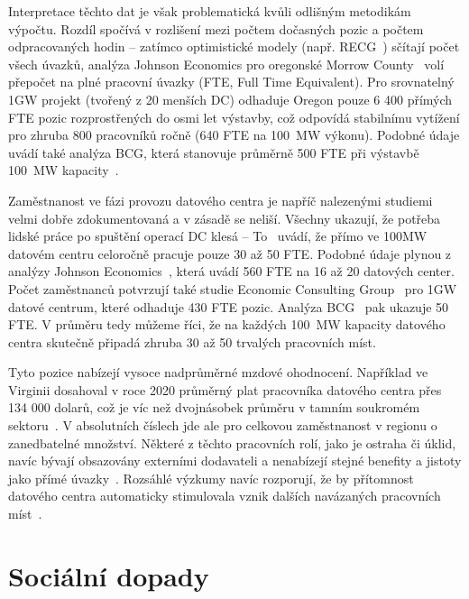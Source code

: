 Interpretace těchto dat je však problematická kvůli odlišným metodikám výpočtu. Rozdíl spočívá v rozlišení mezi počtem dočasných pozic a počtem odpracovaných hodin -- zatímco optimistické modely (např. RECG~\cite{diao_economic_2025}) sčítají počet všech úvazků, analýza Johnson Economics pro oregonské Morrow County~\cite{johnson_economics_economic_2025} volí přepočet na plné pracovní úvazky (FTE, Full Time Equivalent). Pro srovnatelný 1GW projekt (tvořený z 20 menších DC) odhaduje Oregon pouze 6 400 přímých FTE pozic rozprostřených do osmi let výstavby, což odpovídá stabilnímu vytížení pro zhruba 800 pracovníků ročně (640 FTE na 100~MW výkonu). Podobné údaje uvádí také analýza BCG, která stanovuje průměrně 500 FTE při výstavbě 100~MW kapacity~\cite[s.~10]{lee_breaking_2025}.

Zaměstnanost ve fázi provozu datového centra je napříč nalezenými studiemi velmi dobře zdokumentovaná a v zásadě se neliší. Všechny ukazují, že potřeba lidské práce po spuštění operací DC klesá -- To~\cite[s.~7]{to_albertas_2025} uvádí, že přímo ve 100MW datovém centru celoročně pracuje pouze 30 až 50 FTE. Podobné údaje plynou z analýzy Johnson Economics~\cite[s.~15]{johnson_economics_economic_2025}, která uvádí 560 FTE na 16 až 20 datových center. Počet zaměstnanců potvrzují také studie Economic Consulting Group~\cite[s.~14]{diao_economic_2025} pro 1GW datové centrum, které odhaduje 430 FTE pozic. Analýza BCG~\cite[s.~10]{lee_breaking_2025} pak ukazuje 50 FTE. V průměru tedy můžeme říci, že na každých 100~MW kapacity datového centra skutečně připadá zhruba 30 až 50 trvalých pracovních míst.

Tyto pozice nabízejí vysoce nadprůměrné mzdové ohodnocení. Například ve Virginii dosahoval v roce 2020 průměrný plat pracovníka datového centra přes 134 000 dolarů, což je víc než dvojnásobek průměru v tamním soukromém sektoru~\cite[s.~83]{kshetri_data_2024}. V absolutních číslech jde ale pro celkovou zaměstnanost v regionu o zanedbatelné množství. Některé z těchto pracovních rolí, jako je ostraha či úklid, navíc bývají obsazovány externími dodavateli a nenabízejí stejné benefity a jistoty jako přímé úvazky~\cite[s.~7]{green_what_2025}. Rozsáhlé výzkumy navíc rozporují, že by přítomnost datového centra automaticky stimulovala vznik dalších navázaných pracovních míst~\cite{gargano_subsidizing_2025}.

\section{Sociální dopady}
\label{sec:socialni_dopady}

